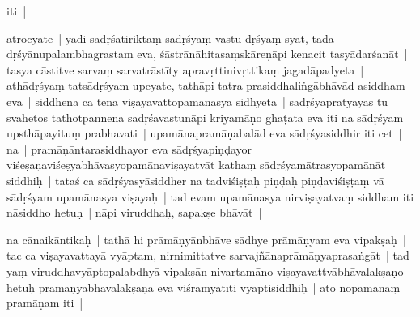 \documentclass[article,12pt,a4paper]{memoir}%
\newcounter{parCount}
\begin{document}
	  
	  

	  
	  \pstart \leavevmode%
	iti |
	{}
	\pend%
      

	  
	  \pstart \leavevmode%
	atrocyate | yadi sadṛśātiriktaṃ sādṛśyaṃ vastu dṛśyaṃ syāt, tadā dṛśyānupalambhagrastam eva, śāstrānāhitasaṃskāreṇāpi kenacit tasyādarśanāt | tasya cāstitve sarvaṃ sarvatrāstīty apravṛttinivṛttikaṃ jagadāpadyeta | athādṛśyaṃ tatsādṛśyam upeyate, tathāpi tatra prasiddhaliṅgābhāvād asiddham eva | siddhena ca tena viṣayavattopamānasya sidhyeta | sādṛśyapratyayas tu svahetos tathotpannena sadṛśavastunāpi kriyamāṇo ghaṭata eva iti na sādṛśyam upsthāpayituṃ prabhavati | upamānapramāṇabalād eva sādṛśyasiddhir iti cet | na | pramāṇāntarasiddhayor eva sādṛśyapiṇḍayor viśeṣaṇaviśeṣyabhāvasyopamānaviṣayatvāt kathaṃ sādṛśyamātrasyopamānāt siddhiḥ | tataś ca sādṛśyasyāsiddher na tadviśiṣṭaḥ piṇḍaḥ piṇḍaviśiṣṭaṃ vā sādṛśyam upamānasya viṣayaḥ | tad evam upamānasya nirviṣayatvaṃ siddham iti nāsiddho hetuḥ | nāpi viruddhaḥ, sapakṣe bhāvāt |
	{}
	\pend%
      

	  
	  \pstart \leavevmode%
	\label{thakur75-102.28}na cānaikāntikaḥ | tathā hi prāmāṇyānbhāve sādhye prāmāṇyam eva vipakṣaḥ | tac ca viṣayavattayā vyāptam, nirnimittatve sarvajñānaprāmāṇyaprasaṅgāt | tad yaṃ viruddhavyāptopalabdhyā vipakṣān nivartamāno viṣayavattvābhāvalakṣaṇo hetuḥ prāmāṇyābhāvalakṣaṇa eva viśrāmyatīti vyāptisiddhiḥ | ato nopamānaṃ pramāṇam iti |
	{}
	\pend%
      
\end{document}
